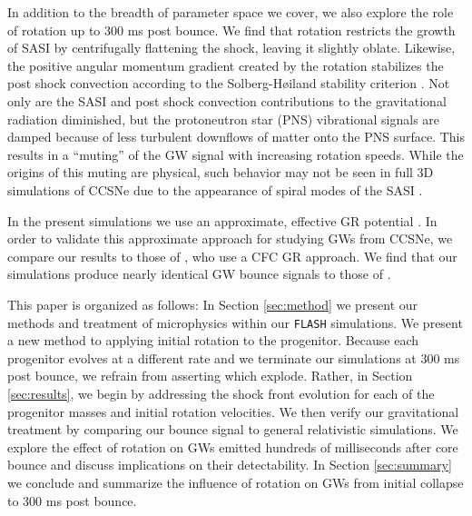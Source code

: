 \documentclass[twocolumn,times]{aastex62}  %
\begin{document}


In addition to the breadth of parameter space we cover, we also explore the role of rotation up to 300 ms post bounce.  
We find that rotation restricts the growth of SASI by centrifugally flattening the shock, leaving it slightly oblate. Likewise, the positive angular momentum gradient created by the rotation stabilizes the post shock convection according to the Solberg-H{\o}iland stability criterion \citep{endal:1978,fryer:2000}.  Not only are the SASI and post shock convection contributions to the gravitational radiation diminished, but the protoneutron star (PNS) vibrational signals are damped because of less turbulent downflows of matter onto the PNS surface.  
This results in a ``muting'' of the GW signal with increasing rotation speeds.
While the origins of this muting are physical, such behavior may not be seen in full 3D simulations of CCSNe due to the appearance of spiral modes of the SASI \citep{andresen:2018}. 

In the present simulations we use an approximate, effective GR potential \citep{marek:2006,oconnor:2018}.
In order to validate this approximate approach for studying GWs from CCSNe, we compare our results to those of \citet{richers:2017}, who use a CFC GR approach.  We find that our simulations produce nearly identical GW bounce signals to those of \citet{richers:2017}.  

This paper is organized as follows:  In Section \ref{sec:method} we present our methods and treatment of microphysics within our \texttt{FLASH} simulations.  We present a new method to applying initial rotation to the progenitor.  Because each progenitor evolves at a different rate and we terminate our simulations at 300 ms post bounce, we refrain from asserting which explode.  Rather, in Section \ref{sec:results}, we begin by addressing the shock front evolution for each of the progenitor masses and initial rotation velocities.  We then verify our gravitational treatment by comparing our bounce signal to general relativistic simulations.  We explore the effect of rotation on GWs emitted hundreds of milliseconds after core bounce and discuss implications on their detectability.  In Section \ref{sec:summary} we conclude and summarize the influence of rotation on GWs from initial collapse to 300 ms post bounce. 
\end{document}
